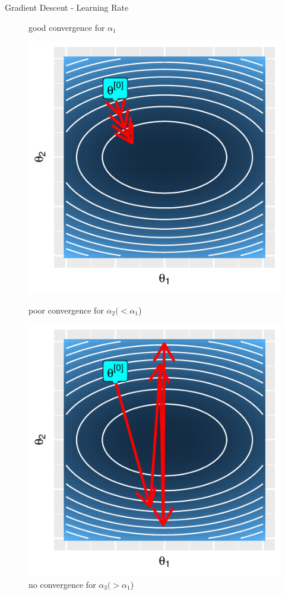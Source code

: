 \documentclass[11pt,compress,t,notes=noshow, xcolor=table]{beamer}
\begin{document}
\begin{vbframe}{Gradient Descent - Learning Rate}
\begin{figure}[!htb]
  \caption*{\tiny good convergence for $\alpha_1$}
\endminipage\hfill
{}
  \includegraphics[width=\linewidth]{figure/grad_desc_alpha2}
  \caption*{\tiny poor convergence for $\alpha_2 (< \alpha_1$)}
\endminipage\hfill
{}%
  \includegraphics[width=\linewidth]{figure/grad_desc_alpha3}
  \caption*{\tiny no convergence for $\alpha_3 (> \alpha_1$)}
\endminipage
\end{figure}

\end{vbframe}
\end{document}
